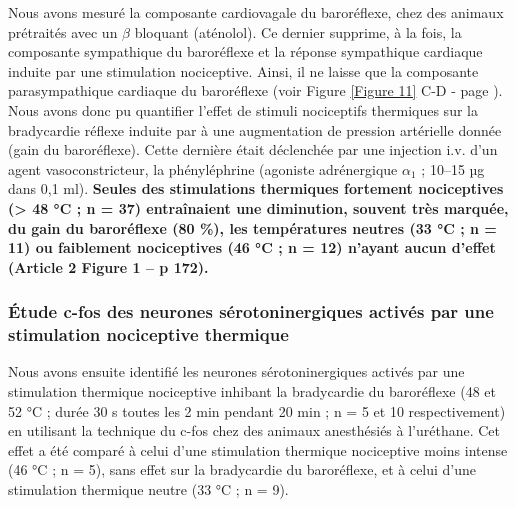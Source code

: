 \documentclass[a4paper,12pt,twoside]{report}
\begin{document}
Nous avons mesuré la composante cardiovagale du baroréflexe, chez des animaux prétraités avec un $\beta$ bloquant (aténolol). Ce dernier supprime, à la fois, la composante sympathique du baroréflexe et la réponse sympathique cardiaque induite par une stimulation nociceptive. Ainsi, il ne laisse que la composante parasympathique cardiaque du baroréflexe (voir Figure \ref{Figure 11} C-D - page \pageref{Figure 11}). Nous avons donc pu quantifier l’effet de stimuli nociceptifs thermiques sur la bradycardie réflexe induite par à une augmentation de pression artérielle donnée (gain du baroréflexe). Cette dernière était déclenchée par une injection i.v. d’un agent vasoconstricteur, la phényléphrine (agoniste adrénergique $\alpha_{1}$ ; 10–15 µg dans 0,1 ml). \textbf{Seules des stimulations thermiques fortement nociceptives (> 48 °C ; n = 37) entraînaient une diminution, souvent très marquée, du gain du baroréflexe (80 \%), les températures neutres (33 °C ; n = 11) ou faiblement nociceptives (46 °C ; n = 12) n’ayant aucun d’effet (Article 2 Figure 1 – p 172).}

\subsubsection{Étude c-fos des neurones sérotoninergiques activés par une stimulation nociceptive thermique}

Nous avons ensuite identifié les neurones sérotoninergiques activés par une stimulation thermique nociceptive inhibant la bradycardie du baroréflexe (48 et 52 °C ; durée 30 s toutes les 2 min pendant 20 min ; n = 5 et 10 respectivement) en utilisant la technique du c-fos chez des animaux anesthésiés à l’uréthane. Cet effet a été comparé à celui d'une stimulation thermique nociceptive moins intense (46 °C ; n = 5), sans effet sur la bradycardie du baroréflexe, et à celui d'une stimulation thermique neutre (33 °C ; n = 9).
\end{document}
